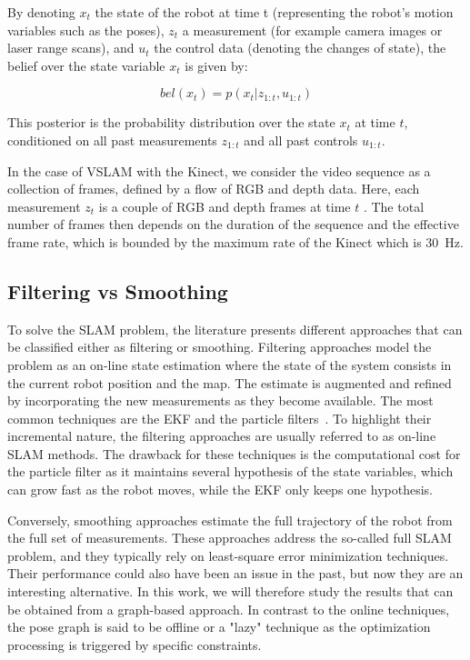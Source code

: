 By denoting $x_t$ the state of the robot at time t (representing the robot's motion variables such as the poses), $z_t$ a measurement (for example camera images or laser range scans), and $u_t$ the control data (denoting the changes of state), the belief over the state variable $x_t$ is given by:

\[bel(x_t) = p(x_t | z_{1:t}, u_{1:t})\]

This posterior is the probability distribution over the state $x_t$ at time $t$, conditioned on all past measurements $z_{1:t}$ and all past controls $u_{1:t}$.

In the case of \gls{VSLAM} with the Kinect, we consider the video sequence as a collection of frames, defined by a flow of RGB and depth data. Here, each measurement $z_t$ is a couple of RGB and depth frames at time $t$ . The total number of frames then depends on the duration of the sequence and the effective frame rate, which is bounded by the maximum rate of the Kinect which is 30~Hz.


\subsection{Filtering vs Smoothing}

To solve the \gls{SLAM} problem, the literature presents different approaches that can be classified either as filtering or smoothing. Filtering approaches model the problem as an on-line state estimation where the state of the system consists in the current robot position and the map. The estimate is augmented and refined by incorporating the new measurements as they become available.
The most common techniques are the \gls{EKF} and the particle filters~\cite{Thrun_2005}. To highlight their incremental nature, the filtering approaches are usually referred to as on-line \gls{SLAM} methods. The drawback for these techniques is the computational cost for the particle filter as it maintains several hypothesis of the state variables, which can grow fast as the robot moves, while the \gls{EKF} only keeps one hypothesis.

Conversely, smoothing approaches estimate the full trajectory of the robot from the full set of measurements. These approaches address the so-called full \gls{SLAM} problem, and they typically rely on least-square error minimization techniques. Their performance could also have been an issue in the past, but now they are an interesting alternative. In this work, we will therefore study the results that can be obtained from a graph-based approach. In contrast to the online techniques, the pose graph is said to be offline or a "lazy" technique as the optimization processing is triggered by specific constraints.

